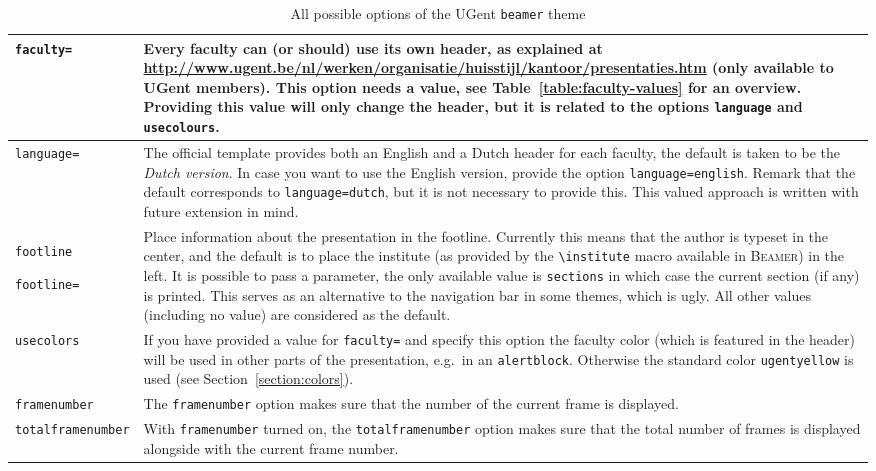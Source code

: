 \documentclass[a4paper,10pt]{article}
\theoremstyle{definition}
\begin{document}
\begin{table}
  \begin{tabulary}{12cm}{p{3cm}L}
    \toprule
    \texttt{faculty=} & Every faculty can (or should) use its own header, as explained at \url{http://www.ugent.be/nl/werken/organisatie/huisstijl/kantoor/presentaties.htm} (only available to UGent members). This option needs a value, see Table~\ref{table:faculty-values} for an overview. Providing this value will only change the header, but it is related to the options \texttt{language} and \texttt{usecolours}. \\\midrule
    \texttt{language=} & The official template provides both an English and a Dutch header for each faculty, the default is taken to be the \emph{Dutch version}. In case you want to use the English version, provide the option \texttt{language=english}. Remark that the default corresponds to \texttt{language=dutch}, but it is not necessary to provide this. This valued approach is written with future extension in mind. \\\midrule
    \texttt{footline} \par \texttt{footline=} & Place information about the presentation in the footline. Currently this means that the author is typeset in the center, and the default is to place the institute (as provided by the \verb|\institute| macro available in \textsc{Beamer}) in the left. It is possible to pass a parameter, the only available value is \texttt{sections} in which case the current section (if any) is printed. This serves as an alternative to the navigation bar in some themes, which is ugly. All other values (including no value) are considered as the default. \\\midrule
    \texttt{usecolors} & If you have provided a value for \texttt{faculty=} and specify this option the faculty color (which is featured in the header) will be used in other parts of the presentation, e.g.\ in an \texttt{alertblock}. Otherwise the standard color \texttt{ugentyellow} is used (see Section~\ref{section:colors}). \\\midrule
    \texttt{framenumber} & The \texttt{framenumber} option makes sure that the number of the current frame is displayed. \\\midrule
    \texttt{totalframenumber} & With \texttt{framenumber} turned on, the \texttt{totalframenumber} option makes sure that the total number of frames is displayed alongside with the current frame number.\\\bottomrule
  \end{tabulary}
  \caption{All possible options of the UGent \texttt{beamer} theme}
  \label{table:options}
\end{table}
\end{document}
